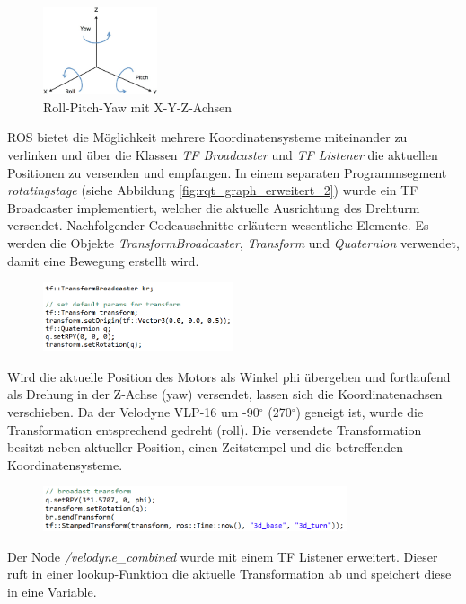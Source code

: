 \begin{figure}[H]
		\centering
	\includegraphics[width=0.3\textwidth]{resources/rollpitchyaw.png}
	\caption[{Roll-Pitch-Yaw mit X-Y-Z-Achsen}]{Roll-Pitch-Yaw mit X-Y-Z-Achsen}
	\label{fig:rollpitchyaw}
\end{figure} 

ROS bietet die Möglichkeit mehrere Koordinatensysteme miteinander zu verlinken und über die Klassen \textit{TF Broadcaster} und \textit{TF Listener} die aktuellen Positionen zu versenden und empfangen. In einem separaten Programmsegment \textit{rotatingstage} (siehe Abbildung \ref{fig:rqt_graph_erweitert_2}) wurde ein TF Broadcaster implementiert, welcher die aktuelle Ausrichtung des Drehturm versendet. Nachfolgender Codeauschnitte erläutern wesentliche Elemente. Es werden die Objekte \textit{TransformBroadcaster}, \textit{Transform} und \textit{Quaternion} verwendet, damit eine Bewegung erstellt wird.
\begin{figure}[H]
	\includegraphics[width=0.5\textwidth]{resources/sourcecode/tf_broadcaster.png}	
\end{figure} 
Wird die aktuelle Position des Motors als Winkel phi übergeben und fortlaufend als Drehung in der Z-Achse (yaw) versendet, lassen sich die Koordinatenachsen verschieben. Da der Velodyne VLP-16 um -90$^\circ$ (270$^\circ$) geneigt ist, wurde die Transformation entsprechend gedreht (roll). Die versendete Transformation besitzt neben aktueller Position, einen Zeitstempel und die betreffenden Koordinatensysteme.
\begin{figure}[H]
	\includegraphics[width=0.8\textwidth]{resources/sourcecode/setrotation.png}	
\end{figure}
Der Node \textit{/velodyne\_combined} wurde mit einem TF Listener erweitert. Dieser ruft in einer lookup-Funktion die aktuelle Transformation ab und speichert diese in eine Variable.
